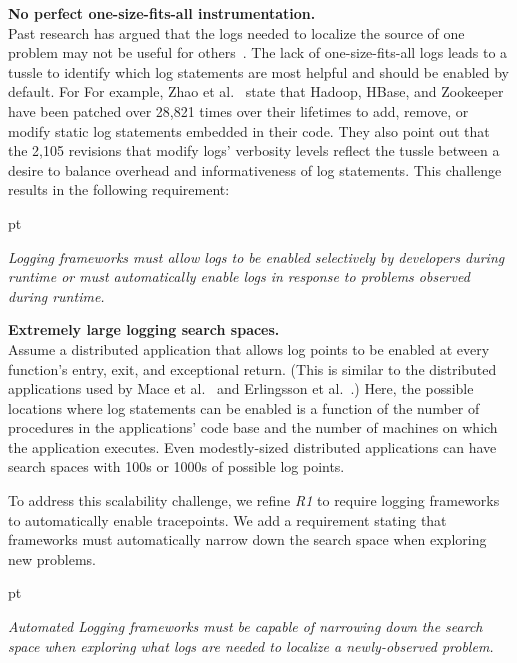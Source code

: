 \noindent\textbf{No perfect one-size-fits-all instrumentation.}
\\
Past research has argued that the logs needed to localize the
source of one problem may not be useful for others~\cite{Mace:2015uh,
  Yuan:2012eh, Zhao:2017co, Vef:2018bx}.  
The lack of one-size-fits-all logs leads to a tussle to identify which
log statements are most helpful and should be enabled by default.  For
For example, Zhao et al.~\cite{Zhao:2017co} state that Hadoop, HBase, and
Zookeeper have been patched over 28,821 times over their lifetimes to
add, remove, or modify static log statements embedded in their code.
They also point out that the 2,105 revisions that modify logs'
verbosity levels reflect the tussle between a desire to balance
overhead and informativeness of log statements.
This challenge results in the following requirement: 
\begin{description}%
     pt
  \item[\textit{R1}] \textit{Logging frameworks must allow logs to be
    enabled selectively by developers during runtime or must
    automatically enable logs in response to problems observed during runtime.}
  \end{description}


  \noindent\textbf{Extremely large logging search spaces.}
\\
Assume a distributed application that allows log points to be enabled
 at every function's entry, exit, and exceptional return. (This
is similar to the distributed applications used by Mace et
al.~\cite{Mace:2015uh} and Erlingsson et
al.~\cite{Erlingsson:2011wy}.)  Here, the possible locations where log
statements can be enabled is a function of the number of procedures in
the applications' code base and the number of machines on which the
application executes.  Even modestly-sized distributed applications
can have search spaces with 100s or 1000s of possible log points.

To address this scalability challenge, we refine \textit{R1} to
require logging frameworks to automatically enable tracepoints.  We
add a requirement stating that frameworks must
automatically narrow down the search space when exploring new
problems.

\begin{description}%
     pt
  \item[\textit{R2}] \textit{Automated Logging frameworks must 
    be capable of narrowing down the search space when exploring what
    logs are needed to localize a newly-observed problem.} 
  \end{description}


